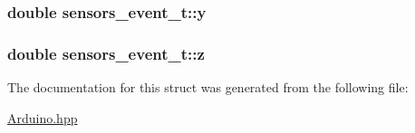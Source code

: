 \subsubsection[{\texorpdfstring{y}{y}}]{\setlength{\rightskip}{0pt plus 5cm}double sensors\+\_\+event\+\_\+t\+::y}\hypertarget{structsensors__event__t_a2a3da084726c159c7330ff1f6069afbc}{}\label{structsensors__event__t_a2a3da084726c159c7330ff1f6069afbc}
\subsubsection[{\texorpdfstring{z}{z}}]{\setlength{\rightskip}{0pt plus 5cm}double sensors\+\_\+event\+\_\+t\+::z}\hypertarget{structsensors__event__t_aec4b79cc80a3a3490735e76e30d7132f}{}\label{structsensors__event__t_aec4b79cc80a3a3490735e76e30d7132f}


The documentation for this struct was generated from the following file\+:\begin{DoxyCompactItemize}
\item 
\hyperlink{Arduino_8hpp}{Arduino.\+hpp}\end{DoxyCompactItemize}
